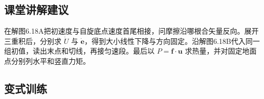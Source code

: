 \documentclass[UTF8,fontset=fandol,a4paper,11pt]{ctexart}
\begin{document}

\subsection*{课堂讲解建议}

在解图6.18A把初速度与自旋底点速度首尾相接，问摩擦沿哪根合矢量反向。展开三重积后，分别求 $\dot U$ 与 $\dot{\boldsymbol e}$，得到大小线性下降与方向固定。沿解图6.18B代入同一组初值，读出末点和切线，再接匀速段。最后以 $P=\boldsymbol f\cdot\boldsymbol u$ 求热量，并对固定地面点分别列水平和竖直力矩。




\subsection*{变式训练}
\end{document}
